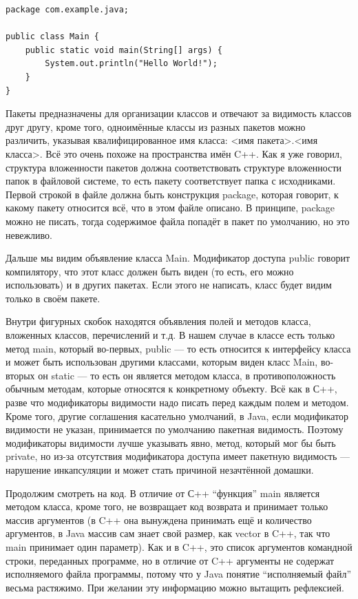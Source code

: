 \documentclass[a5paper]{article}
\begin{document}
\begin{verbatim}
package com.example.java;

public class Main {
    public static void main(String[] args) {
        System.out.println("Hello World!");
    }
}
\end{verbatim}

Пакеты предназначены для организации классов и отвечают за видимость классов друг другу, кроме того, одноимённые классы из разных пакетов можно различить, указывая квалифицированное имя класса: <имя пакета>.<имя класса>. Всё это очень похоже на пространства имён C++. Как я уже говорил, структура вложенности пакетов должна соответствовать структуре вложенности папок в файловой системе, то есть пакету соответствует папка с исходниками. Первой строкой в файле должна быть конструкция package, которая говорит, к какому пакету относится всё, что в этом файле описано. В принципе, package можно не писать, тогда содержимое файла попадёт в пакет по умолчанию, но это невежливо.

Дальше мы видим объявление класса Main. Модификатор доступа public говорит компилятору, что этот класс должен быть виден (то есть, его можно использовать) и в других пакетах. Если этого не написать, класс будет видим только в своём пакете.

Внутри фигурных скобок находятся объявления полей и методов класса, вложенных классов, перечислений и т.д. В нашем случае в классе есть только метод main, который во-первых, public --- то есть относится к интерфейсу класса и может быть использован другими классами, которым виден класс Main, во-вторых он static --- то есть он является методом класса, в противоположность обычным методам, которые относятся к конкретному объекту. Всё как в  С++, разве что модификаторы видимости надо писать перед каждым полем и методом. Кроме того, другие соглашения касательно умолчаний, в Java, если модификатор видимости не указан, принимается по умолчанию пакетная видимость. Поэтому модификаторы видимости лучше указывать явно, метод, который мог бы быть private, но из-за отсутствия модификатора доступа имеет пакетную видимость --- нарушение инкапсуляции и может стать причиной незачтённой домашки.

Продолжим смотреть на код. В отличие от С++ ``функция'' main является методом класса, кроме того, не возвращает код возврата и принимает только массив аргументов (в C++ она вынуждена принимать ещё и количество аргументов, в Java массив сам знает свой размер, как vector в C++, так что main принимает один параметр). Как и в C++, это список аргументов командной строки, переданных программе, но в отличие от C++ аргументы не содержат исполняемого файла программы, потому что у Java понятие ``исполняемый файл'' весьма растяжимо. При желании эту информацию можно вытащить рефлексией.
\end{document}
